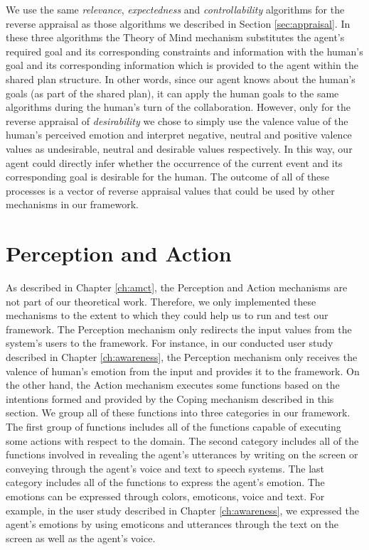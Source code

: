 \documentclass[12pt]{report}
\begin{document}
We use the same \textit{relevance}, \textit{expectedness} and
\textit{controllability} algorithms for the reverse appraisal as those
algorithms we described in Section \ref{sec:appraisal}. In these three
algorithms the Theory of Mind mechanism substitutes the agent's required goal
and its corresponding constraints and information with the human's goal and its
corresponding information which is provided to the agent within the shared plan
structure. In other words, since our agent knows about the human's goals (as
part of the shared plan), it can apply the human goals to the same algorithms during
the human's turn of the collaboration. However, only for the reverse appraisal
of \textit{desirability} we chose to simply use the valence value of the human's
perceived emotion and interpret negative, neutral and positive valence values as
undesirable, neutral and desirable values respectively. In this way, our agent
could directly infer whether the occurrence of the current event and its
corresponding goal is desirable for the human. The outcome of all of these
processes is a vector of reverse appraisal values that could be used by other
mechanisms in our framework.

\section{Perception and Action}
As described in Chapter \ref{ch:amct}, the Perception and Action mechanisms are
not part of our theoretical work. Therefore, we only implemented these
mechanisms to the extent to which they could help us to run and test our
framework. The Perception mechanism only redirects the input values from the
system's users to the framework. For instance, in our conducted user study
described in Chapter \ref{ch:awareness}, the Perception mechanism only receives
the valence of human's emotion from the input and provides it to the framework.
On the other hand, the Action mechanism executes some functions based on the
intentions formed and provided by the Coping mechanism described in this
section. We group all of these functions into three categories in our framework.
The first group of functions includes all of the functions capable of executing
some actions with respect to the domain. The second category includes all of the
functions involved in revealing the agent's utterances by writing on the screen or
conveying through the agent's voice and text to speech systems. The last
category includes all of the functions to express the agent's emotion. The
emotions can be expressed through colors, emoticons, voice and text. For
example, in the user study described in Chapter \ref{ch:awareness}, we expressed
the agent's emotions by using emoticons and utterances through the text on the
screen as well as the agent's voice.
\end{document}
